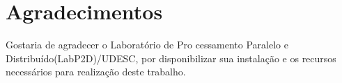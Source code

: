 \section*{Agradecimentos}

Gostaria de agradecer o Laboratório de Pro cessamento Paralelo e Distribuído(LabP2D)/UDESC, por disponibilizar sua instalação e os recursos necessários para realização deste trabalho.